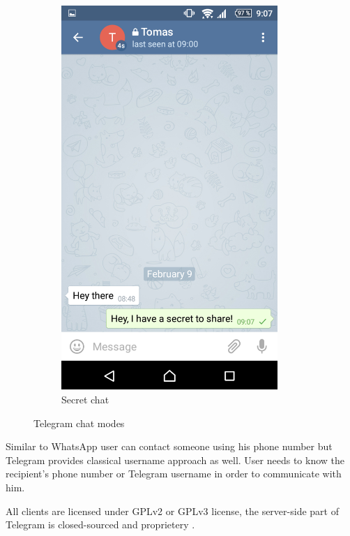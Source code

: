 \documentclass[thesis=M,english]{FITthesis}[2012/10/20]
\begin{document}
\begin{figure}[htb]
\begin{subfigure}[b]{0.4\textwidth}
		\includegraphics[width=0.9\textwidth]{telegram-secret.png}
		\caption{Secret chat}
		\label{img:telegram:secret}
	\end{subfigure}
	\caption{Telegram chat modes}
\end{figure}

Similar to WhatsApp user can contact someone using his phone number but Telegram provides classical username approach as well. User needs to know the recipient's phone number or Telegram username in order to communicate with him.

All clients are licensed under GPLv2 or GPLv3 license, the server-side part of Telegram is closed-sourced and proprietery \cite{telegram-server}.
\end{document}
